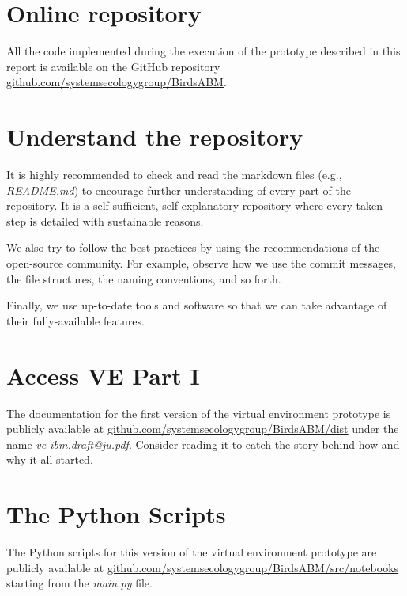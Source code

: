 %
%
%


\clearpage
\appendix
\begin{appendices}
    \section{Online repository}\label{app:code-repo}
    All the code implemented during the execution of the prototype described in this report is available on the GitHub repository \href{https://github.com/systemsecologygroup/BirdsABM}{github.com/systemsecologygroup/BirdsABM}.

    \section{Understand the repository}\label{app:understand-repo}
    It is highly recommended to check and read the markdown files (e.g., \emph{README.md}) to encourage further understanding of every part of the repository. It is a self-sufficient, self-explanatory repository where every taken step is detailed with sustainable reasons.

    We also try to follow the best practices by using the recommendations of the open-source community. For example, observe how we use the commit messages, the file structures, the naming conventions, and so forth.

    Finally, we use up-to-date tools and software so that we can take advantage
    of their fully-available features.

    \section{Access VE Part I}\label{app:access-ve1}
    The documentation for the first version of the virtual environment prototype is publicly available at \href{https://github.com/systemsecologygroup/BirdsABM/dist}{github.com/systemsecologygroup/BirdsABM/dist} under the name \emph{ve-ibm.draft@ju.pdf}. Consider reading it to catch the story behind how and why it all started.

    \section{The Python Scripts}\label{app:python-scripts}
    The Python scripts for this version of the virtual environment prototype are publicly available at \href{https://github.com/systemsecologygroup/BirdsABM/src/notebooks}{github.com/systemsecologygroup/BirdsABM/src/notebooks} starting from the \emph{main.py} file.
\end{appendices}

